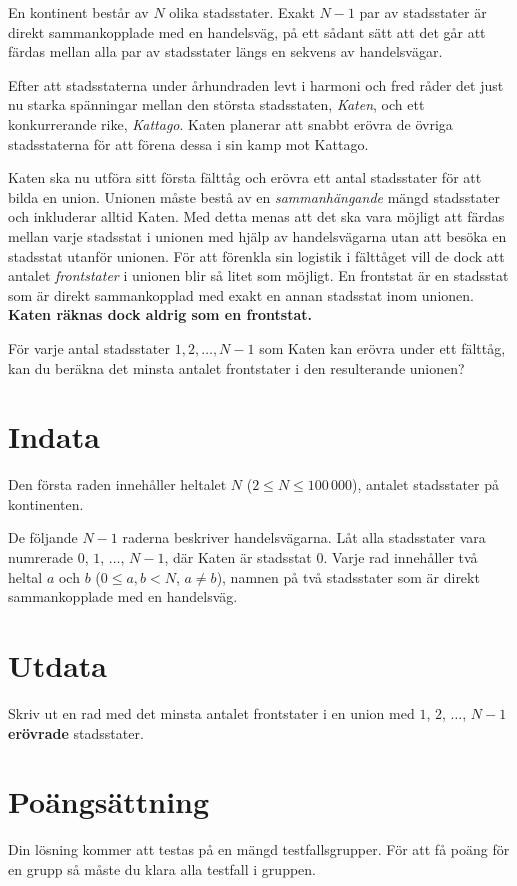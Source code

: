 En kontinent består av $N$ olika stadsstater.
Exakt $N - 1$ par av stadsstater är direkt sammankopplade med en handelsväg, på ett sådant sätt att det går att färdas mellan alla par av stadsstater längs en sekvens av handelsvägar.

Efter att stadsstaterna under århundraden levt i harmoni och fred råder det just nu starka spänningar mellan den största stadsstaten, \emph{Katen}, och ett konkurrerande rike, \emph{Kattago}.
Katen planerar att snabbt erövra de övriga stadsstaterna för att förena dessa i sin kamp mot Kattago.

Katen ska nu utföra sitt första fälttåg och erövra ett antal stadsstater för att bilda en union.
Unionen måste bestå av en \emph{sammanhängande} mängd stadsstater och inkluderar alltid Katen.
Med detta menas att det ska vara möjligt att färdas mellan varje stadsstat i unionen med hjälp av handelsvägarna utan att besöka en stadsstat utanför unionen.
För att förenkla sin logistik i fälttåget vill de dock att antalet \emph{frontstater} i unionen blir så litet som möjligt.
En frontstat är en stadsstat som är direkt sammankopplad med exakt en annan stadsstat inom unionen.
\textbf{Katen räknas dock aldrig som en frontstat.}

För varje antal stadsstater $1, 2, \dots, N-1$ som Katen kan erövra under ett fälttåg, kan du beräkna det minsta antalet frontstater i den resulterande unionen?

\section*{Indata}
Den första raden innehåller heltalet $N$ ($2 \le N \le 100\,000$), antalet stadsstater på kontinenten.

De följande $N - 1$ raderna beskriver handelsvägarna.
Låt alla stadsstater vara numrerade $0$, $1$, $\dots$, $N - 1$, där Katen är stadsstat $0$.
Varje rad innehåller två heltal $a$ och $b$ ($0 \le a, b < N$, $a \neq b$), namnen på två stadsstater som är direkt sammankopplade med en handelsväg.

\section*{Utdata}
Skriv ut en rad med det minsta antalet frontstater i en union med $1$, $2$, $\dots$, $N - 1$ \textbf{erövrade} stadsstater.

\section*{Poängsättning}
Din lösning kommer att testas på en mängd testfallsgrupper.
För att få poäng för en grupp så måste du klara alla testfall i gruppen.

